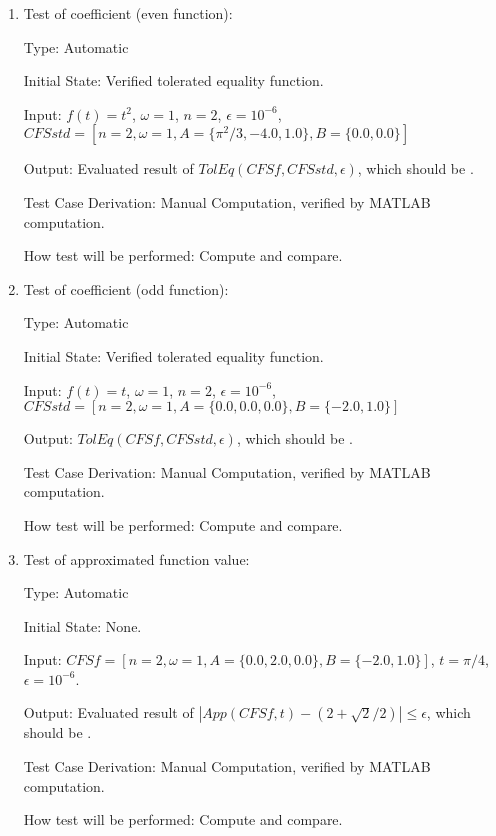 \documentclass[12pt, titlepage]{article}
\begin{document}
\begin{enumerate}
	\item{Test of coefficient (even function):\\}
	
	Type: Automatic
	
	Initial State: Verified tolerated equality function.
	
	Input: $f(t)=t^2$, $\omega=1$, $n=2$, $\epsilon=10^{-6}$,
        $\mathit{CFSstd}=[n=2,\omega=1, A=\{\pi^2/3, -4.0, 1.0\}, B=\{0.0,
        0.0\}]$
	
	Output: Evaluated result of
        $\mathit{TolEq}(\mathit{CFSf}, \mathit{CFSstd}, \epsilon)$, which should
        be . 
	
	Test Case Derivation: Manual Computation, verified by MATLAB
        computation.
	
	How test will be performed: Compute and compare.
	
	\item{Test of coefficient (odd function):\\}
	
	Type: Automatic	
	
	Initial State: Verified tolerated equality function.
	
	Input: $f(t)=t$, $\omega=1$, $n=2$, $\epsilon=10^{-6}$,
        $\mathit{CFSstd}=[n=2,\omega=1, A=\{0.0, 0.0, 0.0\}, B=\{-2.0, 1.0\}]$
	
	Output: $\mathit{TolEq}(\mathit{CFSf}, \mathit{CFSstd}, \epsilon)$,
        which should be .
	
	Test Case Derivation: Manual Computation, verified by MATLAB computation.
	
	How test will be performed: Compute and compare.
	
	\item{Test of approximated function value: \\}
	
	Type: Automatic
	
	Initial State: None.
	
	Input: $\mathit{CFSf}=[n=2,\omega=1, A=\{0.0, 2.0, 0.0\}, B=\{-2.0,
        1.0\}]$, $t=\pi/4$, $\epsilon=10^{-6}$.
	
	Output: Evaluated result of
        $|\mathit{App}(\mathit{CFSf}, t)-(2+\sqrt{2}/2)|\leq\epsilon$, which
        should be .
	
	Test Case Derivation: Manual Computation, verified by MATLAB
        computation.
	
	How test will be performed: Compute and compare.
	
\end{enumerate}
\end{document}
